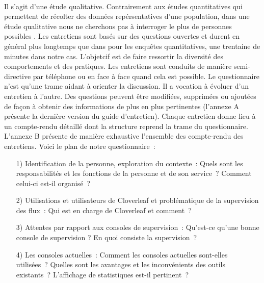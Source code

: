 			\paragraph{}%
			Il s'agit d'une étude qualitative. Contrairement aux études quantitatives qui
			permettent de récolter des données repérsentatives d'une population, dans une
			étude qualitative nous ne cherchons pas à interroger le plus de personnes
			possibles \citep{alami_les_2009}. Les entretiens sont basés sur des questions
			ouvertes et durent en général plus longtemps que dans pour les enquêtes
			quantitatives, une trentaine de minutes dans notre cas.
			L'objetcif est de faire ressortir la diversité des comportements et des
			pratiques.\newline
			Les entretiens sont conduits de manière semi-directive par téléphone ou en
			face à face quand cela est possible.
			Le questionnaire n'est qu'une trame aidant à orienter la discussion. Il a
			vocation à évoluer d’un entretien à l'autre. Des questions peuvent être
			modifiées, supprimées ou ajoutées de façon à obtenir des informations de plus en
			plus pertinentes (l'annexe A présente la dernière version du guide
			d'entretien).
			Chaque entretien donne lieu à un compte-rendu détaillé dont la structure reprend
			la trame du
			questionnaire. L'annexe B présente de manière exhaustive l'ensemble
			des compte-rendu des entretiens.\newline
			Voici le plan de notre
			questionnaire~:
			\begin{itemize}
			  \item[1) Identification de la personne, exploration du contexte~:] Quels
			  sont les responsabilités et les fonctions de la personne et de son
			  service~? Comment celui-ci est-il organisé~?
			  \item[2) Utilisations et utilisateurs de Cloverleaf et problématique de la
			  supervision des flux~:] Qui est en charge de Cloverleaf et comment~?
			  \item[3) Attentes par rapport aux consoles de supervision~:] Qu'est-ce
			  qu'une bonne console de supervision ? En quoi consiste la supervision~?
			  \item[4) Les consoles actuelles~:] Comment les consoles actuelles
			  sont-elles utilisées~? Quelles sont les avantages et les inconvénients des
			  outils existants~? L'affichage de statistiques est-il pertinent~?
			\end{itemize}
			

